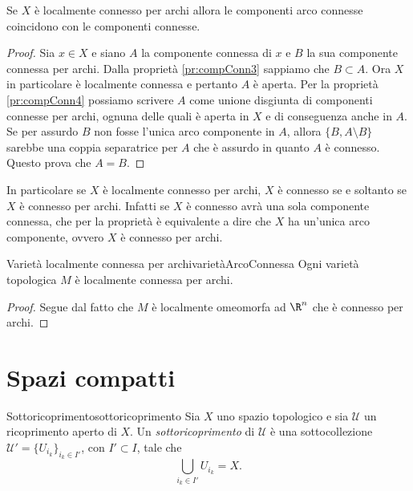 \begin{pr}\label{pr:compConn8}
	Se \(X\) è localmente connesso per archi allora le componenti arco connesse coincidono con le componenti connesse.
\end{pr}

\begin{proof}
	Sia \(x\in X\) e siano \(A\) la componente connessa di \(x\) e \(B\) la sua componente connessa per archi.
	Dalla proprietà \ref{pr:compConn3} sappiamo che \(B\subset A\).
	Ora \(X\) in particolare è localmente connessa e pertanto \(A\) è aperta.
	Per la proprietà \ref{pr:compConn4} possiamo scrivere \(A\) come unione disgiunta di componenti connesse per archi, ognuna delle quali è aperta in \(X\) e di conseguenza anche in \(A\).
	Se per assurdo \(B\) non fosse l'unica arco componente in \(A\), allora \(\{B,A\setminus B\}\) sarebbe una coppia separatrice per \(A\) che è assurdo in quanto \(A\) è connesso.
	Questo prova che \(A=B\).
\end{proof}

\begin{oss}
	In particolare se \(X\) è localmente connesso per archi, \(X\) è connesso se e soltanto se \(X\) è connesso per archi.
	Infatti se \(X\) è connesso avrà una sola componente connessa, che per la proprietà è equivalente a dire che \(X\) ha un'unica arco componente, ovvero \(X\) è connesso per archi.
\end{oss}

\begin{prop}{Varietà localmente connessa per archi}{varietàArcoConnessa}
	Ogni varietà topologica \(M\) è localmente connessa per archi.
\end{prop}

\begin{proof}
	Segue dal fatto che \(M\) è localmente omeomorfa ad \(\R^n\) che è connesso per archi.
\end{proof}
%
%
\section{Spazi compatti}

\begin{defn}{Sottoricoprimento}{sottoricoprimento}
	Sia \(X\) uno spazio topologico e sia \(\mathcal{U}\) un ricoprimento aperto di \(X\).
	Un \emph{sottoricoprimento} di \(\mathcal{U}\) è una sottocollezione \(\mathcal{U}'=\{U_{i_k}\}_{i_k \in I'}\), con \(I'\subset I\), tale che
	\[
		\bigcup_{i_k \in I'}U_{i_k} = X.
	\]
\end{defn}

